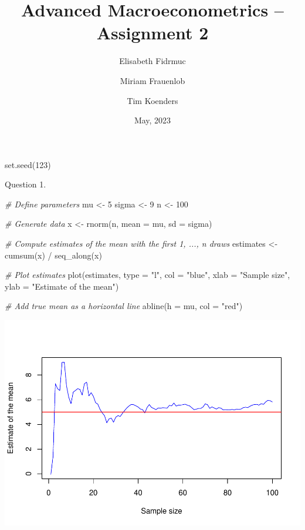 \documentclass[
  a4paper,
]{article}
\title{\textbf{Advanced Macroeconometrics -- Assignment 2}}
\author{Elisabeth Fidrmuc \and Miriam Frauenlob \and Tim Koenders}
\date{May, 2023}
\newenvironment{Shaded}{\begin{snugshade}}{\end{snugshade}}
\newcommand{\AttributeTok}[1]{\textcolor[rgb]{0.77,0.63,0.00}{#1}}
\newcommand{\CommentTok}[1]{\textcolor[rgb]{0.56,0.35,0.01}{\textit{#1}}}
\newcommand{\DecValTok}[1]{\textcolor[rgb]{0.00,0.00,0.81}{#1}}
\newcommand{\FunctionTok}[1]{\textcolor[rgb]{0.00,0.00,0.00}{#1}}
\newcommand{\NormalTok}[1]{#1}
\newcommand{\OtherTok}[1]{\textcolor[rgb]{0.56,0.35,0.01}{#1}}
\newcommand{\SpecialCharTok}[1]{\textcolor[rgb]{0.00,0.00,0.00}{#1}}
\newcommand{\StringTok}[1]{\textcolor[rgb]{0.31,0.60,0.02}{#1}}
\begin{document}
\maketitle

{
\hypersetup{linkcolor=}
\setcounter{tocdepth}{2}
\tableofcontents
}
\begin{Shaded}
\begin{Highlighting}[]
\FunctionTok{set.seed}\NormalTok{(}\DecValTok{123}\NormalTok{)}
\end{Highlighting}
\end{Shaded}

Question 1.

\begin{Shaded}
\begin{Highlighting}[]
\CommentTok{\# Define parameters}
\NormalTok{mu }\OtherTok{\textless{}{-}} \DecValTok{5}
\NormalTok{sigma }\OtherTok{\textless{}{-}} \DecValTok{9}
\NormalTok{n }\OtherTok{\textless{}{-}} \DecValTok{100}

\CommentTok{\# Generate data}
\NormalTok{x }\OtherTok{\textless{}{-}} \FunctionTok{rnorm}\NormalTok{(n, }\AttributeTok{mean =}\NormalTok{ mu, }\AttributeTok{sd =}\NormalTok{ sigma)}

\CommentTok{\# Compute estimates of the mean with the first 1, ..., n draws}
\NormalTok{estimates }\OtherTok{\textless{}{-}} \FunctionTok{cumsum}\NormalTok{(x) }\SpecialCharTok{/} \FunctionTok{seq\_along}\NormalTok{(x)}

\CommentTok{\# Plot estimates}
\FunctionTok{plot}\NormalTok{(estimates, }\AttributeTok{type =} \StringTok{"l"}\NormalTok{, }\AttributeTok{col =} \StringTok{"blue"}\NormalTok{, }\AttributeTok{xlab =} \StringTok{"Sample size"}\NormalTok{, }\AttributeTok{ylab =} \StringTok{"Estimate of the mean"}\NormalTok{)}

\CommentTok{\# Add true mean as a horizontal line}
\FunctionTok{abline}\NormalTok{(}\AttributeTok{h =}\NormalTok{ mu, }\AttributeTok{col =} \StringTok{"red"}\NormalTok{)}
\end{Highlighting}
\end{Shaded}

\includegraphics{RMarkdown_files/figure-latex/two-1.pdf}
\end{document}
